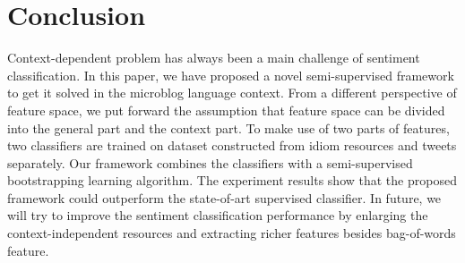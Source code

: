 \documentclass{llncs}
\begin{document}
\section{Conclusion}
\label{conclusion}

Context-dependent problem has always been a main challenge of sentiment classification.
In this paper, we have proposed a novel semi-supervised framework to get it solved in the microblog language context. 
From a different perspective of feature space, we put forward the assumption that feature space can be divided into the general part and the context part.
To make use of two parts of features, two classifiers are trained on dataset constructed from idiom resources and tweets separately. 
Our framework combines the classifiers with a semi-supervised bootstrapping learning algorithm. 
The experiment results show that the proposed framework could outperform the state-of-art supervised classifier. 
In future, we will try to improve the sentiment classification performance by enlarging the context-independent resources and extracting richer features besides bag-of-words feature.



\end{document}
